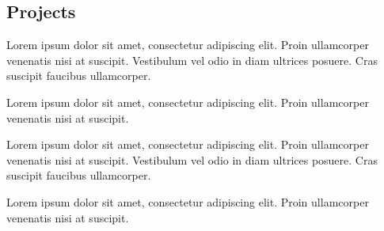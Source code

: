 \documentclass[]{plushcv}
\begin{document}
\begin{paracol}{2}

\section{Projects}

\begin{tightemize}
\item Lorem ipsum dolor sit amet, consectetur adipiscing elit. Proin ullamcorper venenatis nisi at suscipit. Vestibulum vel odio in diam ultrices posuere. Cras suscipit faucibus ullamcorper.
\item Lorem ipsum dolor sit amet, consectetur adipiscing elit. Proin ullamcorper venenatis nisi at suscipit.
\end{tightemize}
\sectionsep

\begin{tightemize}
\item Lorem ipsum dolor sit amet, consectetur adipiscing elit. Proin ullamcorper venenatis nisi at suscipit. Vestibulum vel odio in diam ultrices posuere. Cras suscipit faucibus ullamcorper. 
\item Lorem ipsum dolor sit amet, consectetur adipiscing elit. Proin ullamcorper venenatis nisi at suscipit.
\end{tightemize}
\sectionsep


%
%

\switchcolumn[1]




\end{paracol}
\end{document}
